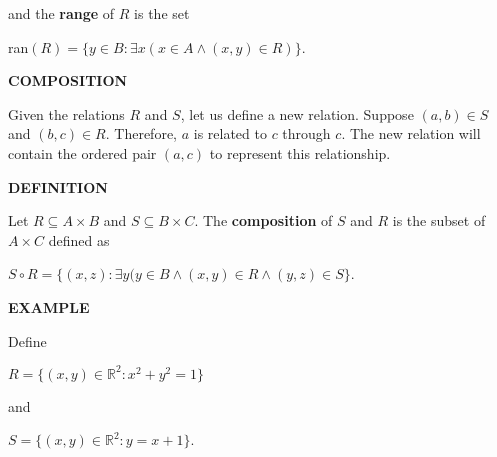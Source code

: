 \documentclass[12pt, a4paper]{article}
\begin{document}
\vspace{4mm}

and the \textbf{range} of $R$ is the set\par

\vspace{4mm}

\centerline{ran$(R)=\{y\in B\colon\exists x(x\in A\wedge(x,y)\in R)\}$.}

\begin{flushleft}

\textbf{COMPOSITION}

\vspace{4mm}

Given the relations $R$ and $S$, let us define a new relation. Suppose $(a,b)\in S$ and $(b,c)\in R$. Therefore, $a$ is related to $c$ through $c$. The new relation will contain the ordered pair $(a,c)$ to represent this relationship.

\vspace{4mm}

\blacksquare \textbf{ DEFINITION}

\end{flushleft}

Let $R\subseteq A\times B$ and $S\subseteq B\times C$. The \textbf{composition} of $S$ and $R$ is the subset of $A\times C$ defined as\par

\vspace{4mm}

\centerline{$S\circ R=\{(x,z)\colon\exists y(y\in B\wedge(x,y)\in R\wedge(y,z)\in S\}$.}

\newpage

\begin{flushleft}

\blacksquare \textbf{ EXAMPLE}

\end{flushleft}

Define\par

\vspace{4mm}

\centerline{$R=\{(x,y)\in\mathbb{R}^2\colon x^2+y^2=1\}$}

\vspace{4mm}

and\par

\vspace{4mm}

\centerline{$S=\{(x,y)\in\mathbb{R}^2\colon y=x+1\}$.}
\end{document}
